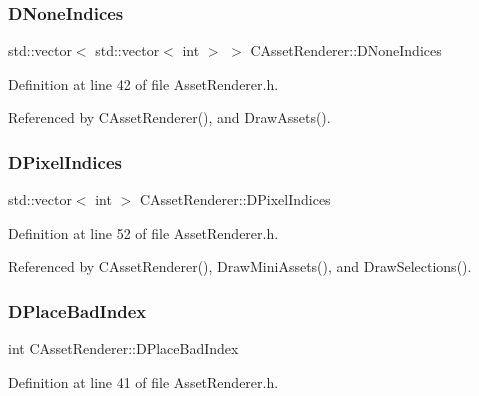 \subsubsection{\texorpdfstring{D\+None\+Indices}{DNoneIndices}}
{\footnotesize\ttfamily std\+::vector$<$ std\+::vector$<$ int $>$ $>$ C\+Asset\+Renderer\+::\+D\+None\+Indices\hspace{0.3cm}{\ttfamily [protected]}}



Definition at line 42 of file Asset\+Renderer.\+h.



Referenced by C\+Asset\+Renderer(), and Draw\+Assets().

\hypertarget{classCAssetRenderer_aa1d9cd6de6b897ec0b5a244bf822e6bd}{}\label{classCAssetRenderer_aa1d9cd6de6b897ec0b5a244bf822e6bd} 
\subsubsection{\texorpdfstring{D\+Pixel\+Indices}{DPixelIndices}}
{\footnotesize\ttfamily std\+::vector$<$ int $>$ C\+Asset\+Renderer\+::\+D\+Pixel\+Indices\hspace{0.3cm}{\ttfamily [protected]}}



Definition at line 52 of file Asset\+Renderer.\+h.



Referenced by C\+Asset\+Renderer(), Draw\+Mini\+Assets(), and Draw\+Selections().

\hypertarget{classCAssetRenderer_a765462ccdeccb81926f565e5d403ed6d}{}\label{classCAssetRenderer_a765462ccdeccb81926f565e5d403ed6d} 
\subsubsection{\texorpdfstring{D\+Place\+Bad\+Index}{DPlaceBadIndex}}
{\footnotesize\ttfamily int C\+Asset\+Renderer\+::\+D\+Place\+Bad\+Index\hspace{0.3cm}{\ttfamily [protected]}}



Definition at line 41 of file Asset\+Renderer.\+h.



